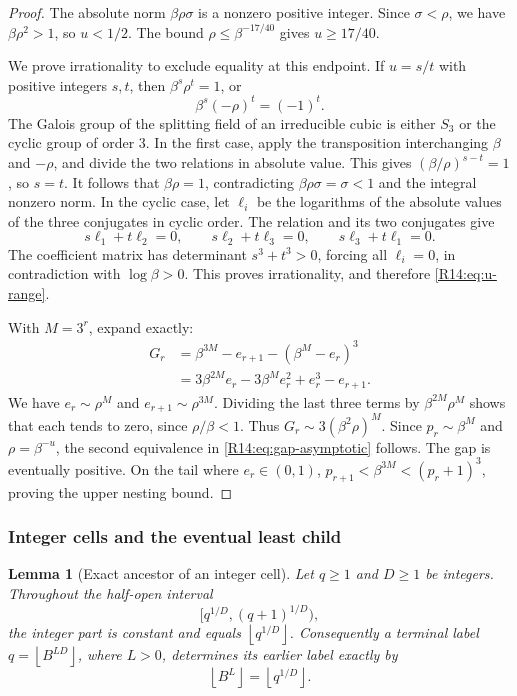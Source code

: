 \documentclass[11pt,a4paper]{article}
\newtheorem{lemma}[theorem]{Lemma}\newtheorem{proposition}[theorem]{Proposition}
\theoremstyle{definition}\newtheorem{definition}[theorem]{Definition}
\theoremstyle{remark}\newtheorem{remark}[theorem]{Remark}
\newcommand{\floor}[1]{\left\lfloor#1\right\rfloor}
\begin{document}
\begin{proof}
The absolute norm $\beta\rho\sigma$ is a nonzero positive integer.
Since $\sigma<\rho$, we have $\beta\rho^2>1$, so $u<1/2$.
The bound $\rho\le\beta^{-17/40}$ gives $u\ge17/40$.

We prove irrationality to exclude equality at this endpoint.
If $u=s/t$ with positive integers $s,t$, then
$\beta^s\rho^t=1$, or
\[
 \beta^s(-\rho)^t=(-1)^t.
\]
The Galois group of the splitting field of an irreducible cubic is
either $S_3$ or the cyclic group of order $3$. In the first case,
apply the transposition interchanging $\beta$ and $-\rho$, and
divide the two relations in absolute value. This gives
$(\beta/\rho)^{s-t}=1$, so $s=t$. It follows that
$\beta\rho=1$, contradicting
$\beta\rho\sigma=\sigma<1$ and the integral nonzero norm.
In the cyclic case, let $\ell_i$ be the logarithms of the absolute
values of the three conjugates in cyclic order. The relation and
its two conjugates give
\[
 s\ell_1+t\ell_2=0,\qquad
 s\ell_2+t\ell_3=0,\qquad
 s\ell_3+t\ell_1=0.
\]
The coefficient matrix has determinant $s^3+t^3>0$, forcing all
$\ell_i=0$, in contradiction with $\log\beta>0$.
This proves irrationality, and therefore \eqref{R14:eq:u-range}.

With $M=3^r$, expand exactly:
\[
 \begin{aligned}
 G_r
 &=\beta^{3M}-e_{r+1}-(\beta^M-e_r)^3\\
 &=3\beta^{2M}e_r-3\beta^Me_r^2+e_r^3-e_{r+1}.
 \end{aligned}
\]
We have $e_r\sim\rho^M$ and $e_{r+1}\sim\rho^{3M}$.
Dividing the last three terms by $\beta^{2M}\rho^M$ shows that
each tends to zero, since $\rho/\beta<1$. Thus
$G_r\sim3(\beta^2\rho)^M$. Since $p_r\sim\beta^M$ and
$\rho=\beta^{-u}$, the second equivalence in
\eqref{R14:eq:gap-asymptotic} follows. The gap is eventually positive.
On the tail where $e_r\in(0,1)$,
$p_{r+1}<\beta^{3M}<(p_r+1)^3$, proving the upper nesting bound.
\end{proof}

\subsubsection{Integer cells and the eventual least child}

\begin{lemma}[Exact ancestor of an integer cell]\label{R14:lem:ancestor}
Let $q\ge1$ and $D\ge1$ be integers. Throughout the half-open
interval
\[
 [q^{1/D},(q+1)^{1/D}),
\]
the integer part is constant and equals $\floor{q^{1/D}}$.
Consequently a terminal label $q=\floor{B^{LD}}$, where $L>0$,
determines its earlier label exactly by
\[
 \floor{B^L}=\floor{q^{1/D}}.
\]
\end{lemma}
\end{document}
